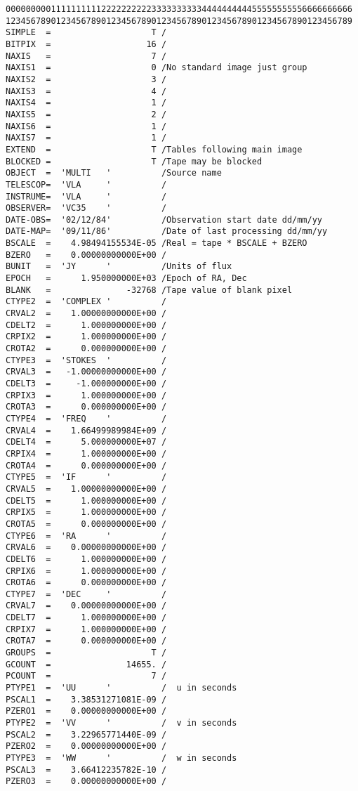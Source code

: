 \begin{verbatim}
000000000111111111122222222223333333333444444444455555555556666666666
123456789012345678901234567890123456789012345678901234567890123456789
SIMPLE  =                    T /
BITPIX  =                   16 /
NAXIS   =                    7 /
NAXIS1  =                    0 /No standard image just group
NAXIS2  =                    3 /
NAXIS3  =                    4 /
NAXIS4  =                    1 /
NAXIS5  =                    2 /
NAXIS6  =                    1 /
NAXIS7  =                    1 /
EXTEND  =                    T /Tables following main image
BLOCKED =                    T /Tape may be blocked
OBJECT  =  'MULTI   '          /Source name
TELESCOP=  'VLA     '          /
INSTRUME=  'VLA     '          /
OBSERVER=  'VC35    '          /
DATE-OBS=  '02/12/84'          /Observation start date dd/mm/yy
DATE-MAP=  '09/11/86'          /Date of last processing dd/mm/yy
BSCALE  =    4.98494155534E-05 /Real = tape * BSCALE + BZERO
BZERO   =    0.00000000000E+00 /
BUNIT   =  'JY      '          /Units of flux
EPOCH   =      1.950000000E+03 /Epoch of RA, Dec
BLANK   =               -32768 /Tape value of blank pixel
CTYPE2  =  'COMPLEX '          /
CRVAL2  =    1.00000000000E+00 /
CDELT2  =      1.000000000E+00 /
CRPIX2  =      1.000000000E+00 /
CROTA2  =      0.000000000E+00 /
CTYPE3  =  'STOKES  '          /
CRVAL3  =   -1.00000000000E+00 /
CDELT3  =     -1.000000000E+00 /
CRPIX3  =      1.000000000E+00 /
CROTA3  =      0.000000000E+00 /
CTYPE4  =  'FREQ    '          /
CRVAL4  =    1.66499989984E+09 /
CDELT4  =      5.000000000E+07 /
CRPIX4  =      1.000000000E+00 /
CROTA4  =      0.000000000E+00 /
CTYPE5  =  'IF      '          /
CRVAL5  =    1.00000000000E+00 /
CDELT5  =      1.000000000E+00 /
CRPIX5  =      1.000000000E+00 /
CROTA5  =      0.000000000E+00 /
CTYPE6  =  'RA      '          /
CRVAL6  =    0.00000000000E+00 /
CDELT6  =      1.000000000E+00 /
CRPIX6  =      1.000000000E+00 /
CROTA6  =      0.000000000E+00 /
CTYPE7  =  'DEC     '          /
CRVAL7  =    0.00000000000E+00 /
CDELT7  =      1.000000000E+00 /
CRPIX7  =      1.000000000E+00 /
CROTA7  =      0.000000000E+00 /
GROUPS  =                    T /
GCOUNT  =               14655. /
PCOUNT  =                    7 /
PTYPE1  =  'UU      '          /  u in seconds
PSCAL1  =    3.38531271081E-09 /
PZERO1  =    0.00000000000E+00 /
PTYPE2  =  'VV      '          /  v in seconds
PSCAL2  =    3.22965771440E-09 /
PZERO2  =    0.00000000000E+00 /
PTYPE3  =  'WW      '          /  w in seconds
PSCAL3  =    3.66412235782E-10 /
PZERO3  =    0.00000000000E+00 /

\end{verbatim}
